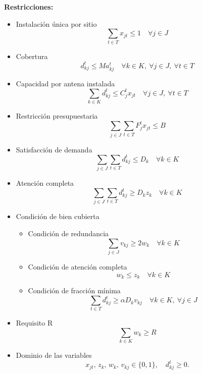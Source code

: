 \textbf{Restricciones:}

\begin{itemize}
    \item Instalación única por sitio
    \begin{equation}
        \sum_{t\in T} x_{jt} \leq 1 \quad  \forall j\in J
    \end{equation}
    \item Cobertura
    \begin{equation}
        d_{kj}^t \leq M a_{kj}^t \quad \forall k\in K,\ \forall j\in J,\ \forall t\in T
    \end{equation}
    \item Capacidad por antena instalada
    \begin{equation}
        \sum_{k\in K} d_{kj}^t \leq C_j^t x_{jt} \quad \forall j\in J,\ \forall t\in T
    \end{equation}
    \item Restricción presupuestaria
    \begin{equation}
        \sum_{j\in J}\sum_{t\in T} F_j^t x_{jt} \leq B
    \end{equation}
    \item Satisfacción de demanda
    \begin{equation}
        \sum_{j\in J}\sum_{t\in T} d_{kj}^t \leq D_k \quad \forall k\in K
    \end{equation}
    \item Atención completa
    \begin{equation}
        \sum_{j\in J}\sum_{t\in T} d_{kj}^t \geq D_k z_k \quad \forall k\in K
    \end{equation}
    \item Condición de bien cubierta
    \begin{itemize}
        \item[a)] Condición de redundancia
        \begin{equation}
            \sum_{j\in J} v_{kj} \geq 2w_k \quad \forall k\in K
        \end{equation}
        \item[b)] Condición de atención completa
        \begin{equation}
            w_k \leq z_k \quad \forall k\in K
        \end{equation}
        \item[c)] Condición de fracción mínima
        \begin{equation}
            \sum_{t\in T} d_{kj}^t \geq \alpha D_k v_{kj} \quad  \forall k\in K,\ \forall j\in J
        \end{equation}
     \end{itemize}
    \item Requisito R
    \begin{equation}
        \sum_{k\in K} w_k \geq R
    \end{equation}
    \item Dominio de las variables
    \begin{equation}
        x_{jt},\,z_k,\,w_k,\,v_{kj} \in \{0,1\}, \quad d_{kj}^t \geq 0.
    \end{equation}
\end{itemize}



